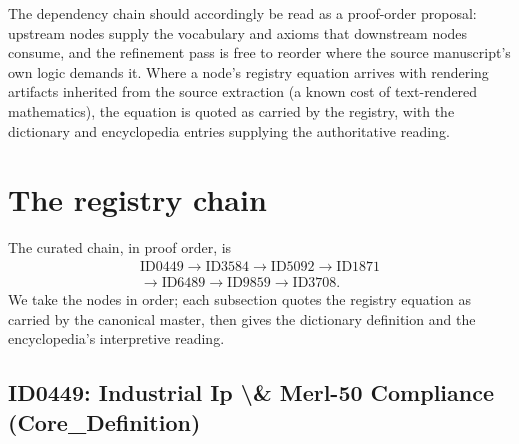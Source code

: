 \documentclass[11pt]{article}
\theoremstyle{remark}
\begin{document}
The dependency chain should accordingly be read as a proof-order proposal: upstream nodes supply the vocabulary and axioms that downstream nodes consume, and the refinement pass is free to reorder where the source manuscript's own logic demands it. Where a node's registry equation arrives with rendering artifacts inherited from the source extraction (a known cost of text-rendered mathematics), the equation is quoted as carried by the registry, with the dictionary and encyclopedia entries supplying the authoritative reading.

\section{The registry chain}
\label{sec:chain}

The curated chain, in proof order, is
\begin{equation*}
\begin{gathered}
\text{ID0449} \to \text{ID3584} \to \text{ID5092} \to \text{ID1871} \\
\to \text{ID6489} \to \text{ID9859} \to \text{ID3708}.
\end{gathered}
\end{equation*}
We take the nodes in order; each subsection quotes the registry equation as carried by the canonical master, then gives the dictionary definition and the encyclopedia's interpretive reading.

\subsection{ID0449: Industrial Ip \textbackslash{}\& Merl-50 Compliance (Core\_Definition)}
\end{document}
